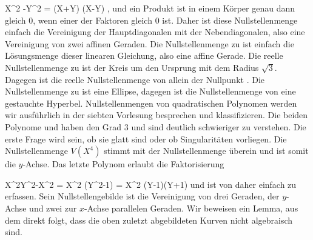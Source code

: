 \mavergleichskette
{\vergleichskette
{X^2 -Y^2
}
{ = }{ (X+Y) (X-Y)
}
{  }{
}
{    }{
}
{   }{
}
}
{}{}{,}
und ein Produkt ist in einem Körper genau dann gleich $0$, wenn einer der Faktoren gleich $0$ ist. Daher ist diese Nullstellenmenge einfach die Vereinigung der Hauptdiagonalen mit der Nebendiagonalen, also eine Vereinigung von zwei affinen Geraden.
Die Nullstellenmenge zu
 ist einfach die Lösungsmenge dieser linearen Gleichung, also eine affine Gerade.
Die reelle Nullstellenmenge zu
 ist der Kreis um den Ursprung mit dem Radius $\sqrt{3}$. Dagegen ist die reelle Nullstellenmenge von
 allein der Nullpunkt
 {} {.}
Die Nullstellenmenge zu
 ist eine
 {} {}
Ellipse, dagegen ist die Nullstellenmenge von
 eine gestauchte Hyperbel. Nullstellenmengen von quadratischen Polynomen werden wir ausführlich in der siebten Vorlesung besprechen und klassifizieren. Die beiden Polynome
 und
 haben den Grad $3$ und sind deutlich schwieriger zu verstehen. Die erste Frage wird sein, ob sie glatt sind oder ob Singularitäten vorliegen. Die Nullstellenmenge $V(X^4)$ stimmt mit der Nullstellenmenge
 überein und ist somit die $y$-Achse. Das letzte Polynom erlaubt die Faktorisierung

\mavergleichskettedisp
{\vergleichskette
{ X^2Y^2-X^2
}
{ =} { X^2 (Y^2-1)
}
{ =} { X^2 (Y-1)(Y+1)
}
{ } {
}
{ } {
}
}
{}{}{} und ist von daher einfach zu erfassen. Sein Nullstellengebilde ist die Vereinigung von drei Geraden, der $y$-Achse und zwei zur $x$-Achse parallelen Geraden.
Wir beweisen ein Lemma, aus dem direkt folgt, dass die oben zuletzt abgebildeten Kurven nicht algebraisch sind.


